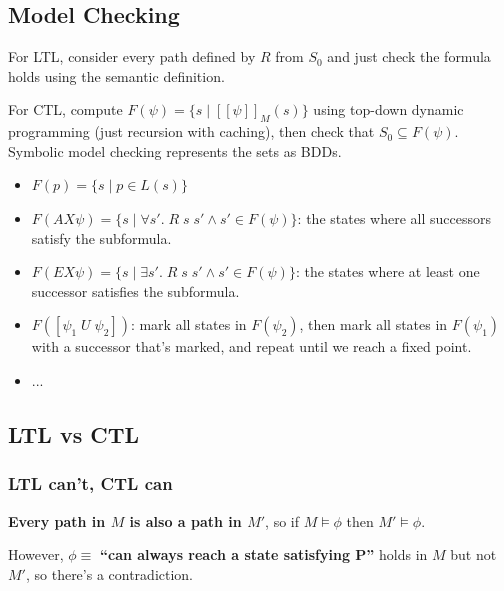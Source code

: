 \documentclass[a4paper, 11pt]{article}
\newcommand{\interp}[2][]{\mathcal{#1}[\![#2]\!]}
\begin{document}
{    \subsection*{Model Checking}
    {
        For LTL, consider every path defined by \(R\) from \(S_0\) and just check the formula holds using the semantic definition.

        For CTL, compute \(F(\psi) = \{s \mid \interp{\psi}_M(s)\}\) using top-down dynamic programming (just recursion with caching), then check that \(S_0 \subseteq F(\psi)\). Symbolic model checking represents the sets as BDDs.
        \begin{itemize}
        \item \(F(p) = \{s \mid p \in L(s)\}\)
        \item \(F(AX \psi) = \{s \mid \forall s'.\; R\;s\;s' \wedge s' \in F(\psi)\}\): the states where all successors satisfy the subformula.
        \item \(F(EX \psi) = \{s \mid \exists s'.\; R\;s\;s' \wedge s' \in F(\psi)\}\): the states where at least one successor satisfies the subformula.
        \item \(F([\psi_1\;U\;\psi_2])\): mark all states in \(F(\psi_2)\), then mark all states in \(F(\psi_1)\) with a successor that's marked, and repeat until we reach a fixed point.
        \item ...
        \end{itemize}
    }
    \subsection*{LTL vs CTL}
    {
        \subsubsection*{LTL can't, CTL can}
        {
            \begin{minipage}[t]{0.7\textwidth}
            \textbf{Every path in \(M\) is also a path in \(M'\)}, so if \(M\vDash\phi\) then \(M'\vDash\phi\).

            However, \(\phi \equiv\) \textbf{``can always reach a state satisfying P''} holds in \(M\) but not \(M'\), so there's a contradiction.


\end{minipage}}}}
\end{document}
